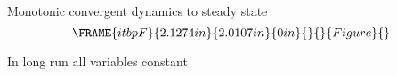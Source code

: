 \documentclass[notes=show]{beamer}
\begin{document}
\begin{frame}%


Monotonic convergent dynamics to steady state%
\begin{equation*}
\FRAME{itbpF}{2.1274in}{2.0107in}{0in}{}{}{Figure}{\special{language
"Scientific Word";type "GRAPHIC";maintain-aspect-ratio TRUE;display
"USEDEF";valid_file "T";width 2.1274in;height 2.0107in;depth
0in;original-width 6.9998in;original-height 6.6115in;cropleft "0";croptop
"1";cropright "1";cropbottom "0";tempfilename
'PEZU5W06.bmp';tempfile-properties "XPR";}}
\end{equation*}

In long run all variables constant

\transboxout%
\end{frame}%
\end{document}
